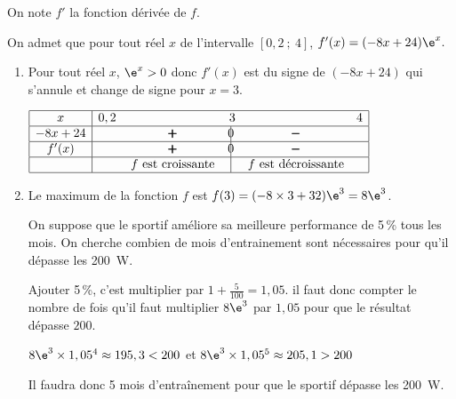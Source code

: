 On note $f'$ la fonction dérivée de $f$. 

On admet que pour tout réel $x$ de l'intervalle $[0,2~;~4]$,
$f'(x)=(-8x+24)\e^{x}.$

\begin{enumerate}
\item%
Pour tout réel $x$, $\e^{x}>0$ donc $f'(x)$ est du signe de $(-8x+24)$ qui s'annule et change de signe pour $x=3$.

\begin{center}
{\renewcommand{\arraystretch}{1.3}
\def\esp{\hspace*{2.5cm}}%
\def\hauteur{0pt}%
$\begin{array}{|c| *4{c} c|}
\hline
 x & 0,2  & \esp & 3 & \esp & 4 \\
  \hline
-8x+24 &  &  \pmb{+} & \vline\hspace{-2.7pt}0 & \pmb{-} & \\  
 \hline
f'(x) &  &  \pmb{+} & \vline\hspace{-2.7pt}0 & \pmb{-} & \\  
\hline
 && f \text{ est croissante} & \vline\hspace{-2.7pt}{\phantom 0} & f \text{ est décroissante} & \\
\hline
\end{array}$
}
\end{center}


\item %
Le maximum de la fonction $f$ est $f(3)= (-8\times 3+32)\e^{3}=8\e^{3}$.

On suppose que le sportif améliore sa meilleure performance de 5\,\% tous les mois. On cherche combien de mois d'entrainement sont nécessaires pour qu'il dépasse les 200~W.

Ajouter 5\,\%, c'est multiplier par $1+\frac{5}{100} = 1,05$. il faut donc compter le nombre de fois qu'il faut multiplier $8\e^{3}$ par $1,05$ pour que le résultat dépasse $200$.

$8\e^{3} \times 1,05^4 \approx 195,3 < 200$ et $8\e^{3} \times 1,05^5 \approx 205,1 > 200$ 

Il faudra donc 5 mois d'entraînement pour que le sportif dépasse les 200~W.

\end{enumerate}

\vspace{0.5cm}


